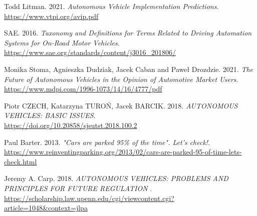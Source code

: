 \documentclass[14pt]{extarticle}
\begin{document}
\newpage
\begin{thebibliography}{999}

  Todd Litman. 2021.
  \emph{Autonomous Vehicle Implementation Predictions}.\\
  \url{https://www.vtpi.org/avip.pdf}
  
  SAE. 2016.
  \emph{Taxonomy and Definitions for Terms Related to Driving Automation Systems for On-Road Motor Vehicles}.\\
  \url{https://www.sae.org/standards/content/j3016_201806/}
   
  Monika Stoma, Agnieszka Dudziak, Jacek Caban and Paweł Drozdzie. 2021.
  \emph{The Future of Autonomous Vehicles in the Opinion of Automotive
Market Users}.\\
  \url{https://www.mdpi.com/1996-1073/14/16/4777/pdf}
   
  Piotr CZECH, Katarzyna TUROŃ, Jacek BARCIK. 2018.
  \emph{AUTONOMOUS VEHICLES: BASIC ISSUES}.\\
  \url{https://doi.org/10.20858/sjsutst.2018.100.2}
  
  Paul Barter. 2013.
  \emph{"Cars are parked 95\% of the time". Let's check!}.\\
  \url{https://www.reinventingparking.org/2013/02/cars-are-parked-95-of-time-lets-check.html}
  
  Jeremy A. Carp. 2018.
  \emph{AUTONOMOUS VEHICLES: PROBLEMS AND PRINCIPLES FOR FUTURE REGULATION }.\\
  \url{ https://scholarship.law.upenn.edu/cgi/viewcontent.cgi?article=1048&context=jlpa}
 
   

\end{thebibliography}
\end{document}
